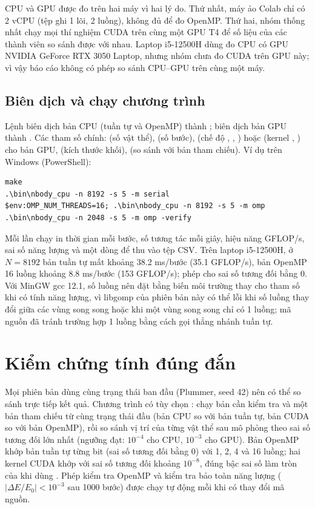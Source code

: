 CPU và GPU được đo trên hai máy vì hai lý do. Thứ nhất, máy ảo Colab chỉ có 2 vCPU (tệp  ghi 1 lõi, 2 luồng), không đủ để đo OpenMP. Thứ hai, nhóm thống nhất chạy mọi thí nghiệm CUDA trên cùng một GPU T4 để số liệu của các thành viên so sánh được với nhau. Laptop i5-12500H dùng đo CPU có GPU NVIDIA GeForce RTX 3050 Laptop, nhưng nhóm chưa đo CUDA trên GPU này; vì vậy báo cáo không có phép so sánh CPU--GPU trên cùng một máy.

\subsection*{Biên dịch và chạy chương trình}

Lệnh  biên dịch bản CPU (tuần tự và OpenMP) thành ;  biên dịch bản GPU thành . Các tham số chính:  (số vật thể),  (số bước),  (chế độ , , ) hoặc  (kernel , ) cho bản GPU,  (kích thước khối),  (so sánh với bản tham chiếu). Ví dụ trên Windows (PowerShell):

\begin{lstlisting}
make
.\bin\nbody_cpu -n 8192 -s 5 -m serial
$env:OMP_NUM_THREADS=16; .\bin\nbody_cpu -n 8192 -s 5 -m omp
.\bin\nbody_cpu -n 2048 -s 5 -m omp -verify
\end{lstlisting}

Mỗi lần chạy in thời gian mỗi bước, số tương tác mỗi giây, hiệu năng GFLOP/s, sai số năng lượng và một dòng  để  thu vào tệp CSV. Trên laptop i5-12500H, ở $N=8192$ bản tuần tự mất khoảng 38.2 ms/bước (35.1 GFLOP/s), bản OpenMP 16 luồng khoảng 8.8 ms/bước (153 GFLOP/s); phép  cho sai số tương đối bằng 0. Với MinGW gcc 12.1, số luồng nên đặt bằng biến môi trường  thay cho tham số  khi có tính năng lượng, vì libgomp của phiên bản này có thể lỗi khi số luồng thay đổi giữa các vùng song song hoặc khi một vùng song song chỉ có 1 luồng; mã nguồn đã tránh trường hợp 1 luồng bằng cách gọi thẳng nhánh tuần tự.

\section{Kiểm chứng tính đúng đắn}
\label{sec:dung-dan}

Mọi phiên bản dùng cùng trạng thái ban đầu (Plummer, seed 42) nên có thể so sánh trực tiếp kết quả. Chương trình có tùy chọn : chạy bản cần kiểm tra và một bản tham chiếu từ cùng trạng thái đầu (bản CPU so với bản tuần tự, bản CUDA so với bản OpenMP), rồi so sánh vị trí của từng vật thể sau mô phỏng theo sai số tương đối lớn nhất (ngưỡng đạt: $10^{-4}$ cho CPU, $10^{-3}$ cho GPU). Bản OpenMP khớp bản tuần tự từng bit (sai số tương đối bằng 0) với 1, 2, 4 và 16 luồng; hai kernel CUDA khớp với sai số tương đối khoảng $10^{-8}$, đúng bậc sai số làm tròn của  khi dùng . Phép kiểm tra OpenMP và kiểm tra bảo toàn năng lượng ($|\Delta E/E_0|<10^{-3}$ sau 1000 bước) được chạy tự động mỗi khi có thay đổi mã nguồn.

